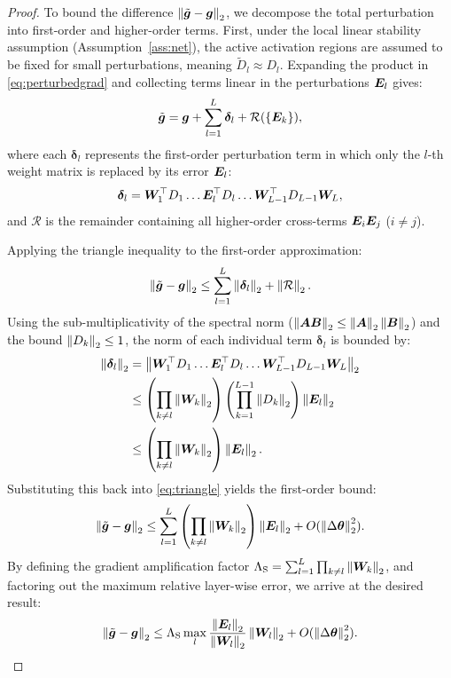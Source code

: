 \begin{proof}
To bound the difference $\left\lVert\tilde{\bm{g}} - \bm{g}\right\rVert_2$, we decompose the total perturbation into first-order and higher-order terms. First, under the local linear stability assumption (Assumption~\ref{ass:net}), the active activation regions are assumed to be fixed for small perturbations, meaning $\tilde{D}_l \approx D_l$. Expanding the product in \eqref{eq:perturbedgrad} and collecting terms linear in the perturbations $\bm{E}_l$ gives:
\begin{equation}
\tilde{\bm{g}} = \bm{g} + \sum_{l=1}^L \bm{\delta}_l + \mathcal{R}(\{\bm{E}_k\}) ,
\end{equation}
where each $\bm{\delta}_l$ represents the first-order perturbation term in which only the $l$-th weight matrix is replaced by its error $\bm{E}_l$:
\begin{equation}
\bm{\delta}_l = \bW_1^{\top} D_1 \dots \bE_l^{\top} D_l \dots \bW_{L-1}^{\top} D_{L-1} \bW_L ,
\end{equation}
and $\mathcal{R}$ is the remainder containing all higher-order cross-terms $\bm{E}_i \bm{E}_j$ ($i \ne j$).

Applying the triangle inequality to the first-order approximation:
\begin{equation}
\left\lVert\tilde{\bm{g}} - \bm{g}\right\rVert_2 \le \sum_{l=1}^L \left\lVert\bm{\delta}_l\right\rVert_2 + \left\lVert\mathcal{R}\right\rVert_2 .
\label{eq:triangle}
\end{equation}
Using the sub-multiplicativity of the spectral norm ($\left\lVert\bm{A}\bm{B}\right\rVert_2 \le \left\lVert\bm{A}\right\rVert_2 \left\lVert\bm{B}\right\rVert_2$) and the bound $\left\lVert D_k\right\rVert_2 \le 1$, the norm of each individual term $\bm{\delta}_l$ is bounded by:
\begin{align}
\norm{\bm{\delta}_l}_2 &= \norm{\bW_1^{\top} D_1 \dots \bE_l^{\top} D_l \dots \bW_{L-1}^{\top} D_{L-1} \bW_L}_2 \nonumber \\
&\le \left(\prod_{k \ne l} \norm{\bW_k}_2\right) \left(\prod_{k=1}^{L-1} \norm{D_k}_2\right) \norm{\bE_l}_2 \nonumber \\
&\le \left(\prod_{k \ne l} \norm{\bW_k}_2\right) \norm{\bE_l}_2 .
\end{align}
Substituting this back into \eqref{eq:triangle} yields the first-order bound:
\begin{equation}
\left\lVert\tilde{\bm{g}} - \bm{g}\right\rVert_2 \le \sum_{l=1}^L \left(\prod_{k \ne l} \left\lVert\bm{W}_k\right\rVert_2\right) \left\lVert\bm{E}_l\right\rVert_2 + O(\left\lVert\Delta\bm{\theta}\right\rVert_2^2) .
\end{equation}
By defining the gradient amplification factor $\Lambda_{\mathrm{S}} = \sum_{l=1}^L \prod_{k \ne l} \left\lVert\bm{W}_k\right\rVert_2$, and factoring out the maximum relative layer-wise error, we arrive at the desired result:
\begin{equation}
\left\lVert\tilde{\bm{g}} - \bm{g}\right\rVert_2 \le \Lambda_{\mathrm{S}} \max_l \frac{\left\lVert\bm{E}_l\right\rVert_2}{\left\lVert\bm{W}_l\right\rVert_2} \left\lVert\bm{W}_l\right\rVert_2 + O(\left\lVert\Delta\bm{\theta}\right\rVert_2^2) .
\label{eq:finalfirstorder}
\end{equation}


\end{proof}
